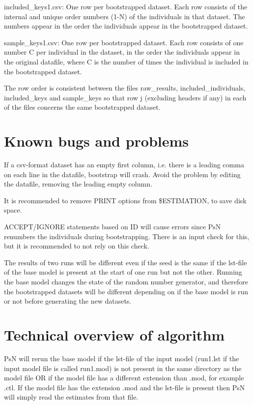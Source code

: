 included\_keys1.csv: One row per bootstrapped dataset. Each row consists of the internal and unique order numbers (1-N) of the individuals in that dataset. The numbers appear in the order the individuals appear in the bootstrapped dataset. 

sample\_keys1.csv:  One row per bootstrapped dataset. Each row consists of one number C per individual in the dataset, in the order the individuals appear in the original datafile, where C is the number of times the individual is included in the bootstrapped dataset. 

The row order is consistent between the files raw\_results, included\_individuals, included\_keys and sample\_keys so that row j (excluding headers if any) in each of the files concerns the same bootstrapped dataset.

\section{Known bugs and problems}

If a csv-format dataset has an empty first column, i.e. there is a leading comma on each line in the datafile, bootstrap will crash. Avoid the problem by editing the datafile, removing the leading empty column.

It is recommended to remove PRINT options from \$ESTIMATION, to save disk space.

ACCEPT/IGNORE statements based on ID will cause errors since PsN renumbers the individuals during bootstrapping. There is an input check for this, but it is recommended to not rely on this check.

The results of two runs will be different even if the seed is the same if the lst-file of the base model is present at the start of one run but not the other. Running the base model changes the state of the random number generator, and therefore the bootstrapped datasets will be different depending on if the base model is run or not before generating the  new datasets. 

\section{Technical overview of algorithm}

PsN will rerun the base model if the lst-file of the input model (run1.lst if the input model file is called run1.mod) is not present in the same directory as the model file OR if the model file has a different extension than .mod, for example .ctl. If the model file has the extension .mod and the lst-file is present then PsN will simply read the estimates from that file.

